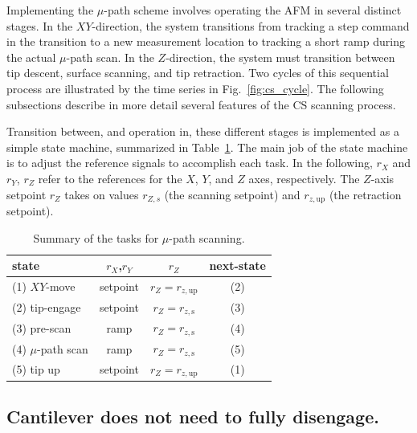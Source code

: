 \documentclass[journal]{IEEEtran}
\newcommand{\rzup}{\ensuremath{r_{z,\textrm{up}}}\xspace}
\newcommand{\rzs}{\ensuremath{r_{z,\textrm{s}}}\xspace}
\begin{document}
Implementing the $\mu$-path scheme involves operating the AFM in
several distinct stages. In the $XY$-direction, the system transitions
from tracking a step command in the transition to a new measurement
location to tracking a short ramp during the actual $\mu$-path scan.
In the $Z$-direction, the system must transition between tip descent,
surface scanning, and tip retraction. Two cycles of this sequential
process are illustrated by the time series in Fig.~\ref{fig:cs_cycle}.
The following subsections describe in more detail several features of
the CS scanning process.

Transition between, and operation in, these different stages is
implemented as a simple state machine, summarized in
Table~\ref{tab:cs_tasks}. The main job of the state machine is to
adjust the reference signals to accomplish each task. In the
following, $r_X$ and $r_Y$, $r_Z$ refer to the references for the
$X$, $Y$, and $Z$ axes, respectively. The $Z$-axis setpoint $r_Z$
takes on values $r_{Z,s}$ (the scanning setpoint) and $\rzup$ (the
retraction setpoint).

\begin{table}[h!]
  \centering
  \caption{Summary of the tasks for $\mu$-path scanning.}
  \begin{tabular}{lccc}
    state & $r_X$,$r_Y$ & $r_Z$ & next-state\\
    \toprule
    (1) $XY$-move & setpoint & $r_Z = \rzup$ & (2)\\
    (2) tip-engage & setpoint & $r_Z = \rzs$ & (3)\\
    (3) pre-scan & ramp & $r_Z = \rzs$ & (4)\\
    (4) $\mu$-path scan & ramp & $r_Z = \rzs$ & (5)\\
    (5) tip up & setpoint & $r_Z = \rzup$ & (1)\\
  \end{tabular}
  \label{tab:cs_tasks}
\end{table}

  
\subsection{Cantilever does not need to fully disengage.}
  
\end{document}

